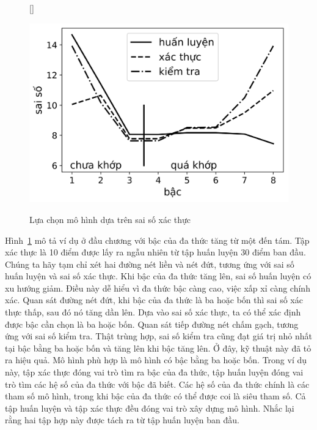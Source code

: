 
\begin{figure}[t]
[\FBwidth]
{\caption{
Lựa chọn mô hình dựa trên sai số xác thực
}
\label{fig:15_validerror}}
{ %
\includegraphics[width=.5\textwidth]{Chapters/01_Overview/15_overfitting/linreg_val.png}
}
\end{figure}
Hình~\ref{fig:15_validerror} mô tả ví dụ ở đầu chương với bậc của đa thức tăng
từ một đến tám. Tập xác thực là 10 điểm được lấy ra ngẫu nhiên từ tập huấn luyện
30 điểm ban đầu. Chúng ta hãy tạm chỉ xét hai đường nét liền và nét đứt, tương
ứng với {sai số huấn luyện} và {sai số xác thực}. Khi bậc của đa thức tăng lên,
{sai số huấn luyện} có xu hướng giảm. Điều này dễ hiểu vì đa thức bậc càng cao,
việc xấp xỉ càng chính xác. Quan sát đường nét đứt, khi bậc của đa thức là ba
hoặc bốn thì {sai số xác thực} thấp, sau đó nó tăng dần lên. Dựa vào
{sai số xác thực}, ta có thể xác định được bậc cần chọn là ba hoặc bốn. Quan
sát tiếp đường nét chấm gạch, tương ứng với {sai số kiểm tra}. Thật trùng hợp, sai số kiểm tra cũng đạt giá trị nhỏ nhất tại bậc bằng ba hoặc bốn và tăng lên khi bậc
tăng lên. Ở đây, kỹ thuật này đã tỏ ra hiệu quả. Mô hình phù hợp là mô hình có
bậc bằng ba hoặc bốn. Trong ví dụ này, tập xác thực đóng vai trò tìm ra bậc
của đa thức, tập huấn luyện đóng vai trò tìm các hệ số của đa thức
với bậc đã biết. Các hệ số của đa thức chính là các tham số mô hình,
trong khi bậc của đa thức có thể được coi là {siêu tham số}. Cả tập
huấn luyện và tập xác thực đều đóng vai trò xây dựng mô hình. Nhắc lại rằng
hai tập hợp này được tách ra từ tập huấn luyện ban đầu.

